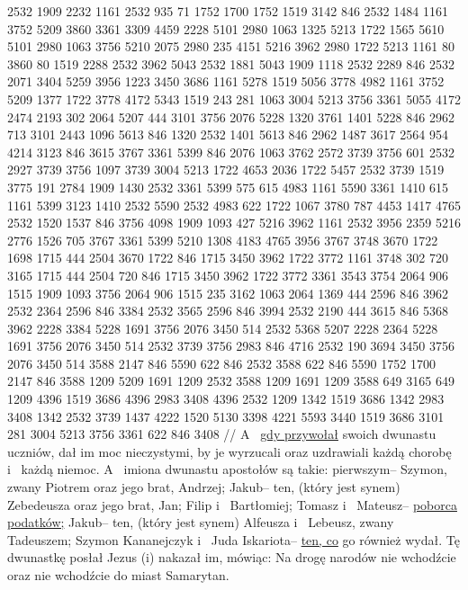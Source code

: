 {} 2532 1909 2232 1161 2532 935 71 1752 1700 1752 1519 3142 846 2532 1484
{} 1161 3752 5209 3860 3361 3309 4459 2228 5101 2980 1063 1325 5213 1722 1565 5610 5101 2980
{} 1063 3756 5210 2075 2980 235 4151 5216 3962 2980 1722 5213
{} 1161 80 3860 80 1519 2288 2532 3962 5043 2532 1881 5043 1909 1118 2532 2289 846
{} 2532 2071 3404 5259 3956 1223 3450 3686 1161 5278 1519 5056 3778 4982
{} 1161 3752 5209 1377 1722 3778 4172 5343 1519 243 281 1063 3004 5213 3756 3361 5055 {} 4172 2474 2193 302 2064 5207 444
{} 3101 3756 2076 5228 1320 3761 1401 5228 846 2962
{} 713 3101 2443 1096 5613 846 1320 2532 1401 5613 846 2962 1487 3617 2564 954 {} 4214 3123 846 3615
{} 3767 3361 5399 846 2076 1063 3762 2572 3739 3756 601 2532 2927 3739 3756 1097
{} 3739 3004 5213 1722 4653 2036 1722 5457 2532 3739 1519 3775 191 2784 1909 1430
{} 2532 3361 5399 575 615 4983 1161 5590 3361 1410 615 1161 5399 3123 1410 2532 5590 2532 4983 622 1722 1067
{} 3780 787 4453 1417 4765 2532 1520 1537 846 3756 4098 1909 1093 427 {} 5216 3962
{} 1161 2532 3956 2359 5216 2776 1526 705
{} 3767 3361 5399 5210 1308 4183 4765
{} 3956 3767 3748 3670 1722 1698 1715 444 2504 3670 1722 846 1715 3450 3962 1722 3772
{} 1161 3748 302 720 3165 1715 444 2504 720 846 1715 3450 3962 1722 3772
{} 3361 3543 3754 2064 906 1515 1909 1093 3756 2064 906 1515 235 3162
{} 1063 2064 1369 {} 444 {} 2596 846 3962 2532 2364 2596 846 3384 2532 3565 2596 846 3994
{} 2532 2190 444 3615 846
{} 5368 3962 2228 3384 5228 1691 3756 2076 3450 514 2532 5368 5207 2228 2364 5228 1691 3756 2076 3450 514
{} 2532 3739 3756 2983 846 4716 2532 190 3694 3450 3756 2076 3450 514
{} 3588 2147 846 5590 622 846 2532 3588 622 846 5590 1752 1700 2147 846
{} 3588 1209 5209 1691 1209 2532 3588 1209 1691 1209 3588 649 3165 649
{} 1209 4396 1519 3686 4396 2983 3408 4396 2532 1209 1342 1519 3686 1342 2983 3408 1342
{} 2532 3739 1437 4222 1520 {} 5130 3398 4221 5593 {} 3440 1519 3686 3101 281 3004 5213 3756 3361 622 846 3408
//
\glb
 A~ \underline{gdy przywołał} swoich dwunastu uczniów, dał im moc  nieczystymi, by je wyrzucali oraz uzdrawiali każdą chorobę i~ każdą niemoc.
 A~ imiona dwunastu apostołów są takie: pierwszym– Szymon, zwany Piotrem oraz jego brat, Andrzej; Jakub– ten, (który jest synem) Zebedeusza oraz jego brat, Jan;
 Filip i~ Bartłomiej; Tomasz i~ Mateusz– \underline{poborca podatków;} Jakub– ten, (który jest synem) Alfeusza i~ Lebeusz, zwany Tadeuszem;
 Szymon Kananejczyk i~ Juda Iskariota– \underline{ten, co} go również wydał.
 Tę dwunastkę posłał Jezus (i) nakazał im, mówiąc: Na drogę narodów nie wchodźcie oraz nie wchodźcie do miast Samarytan.
